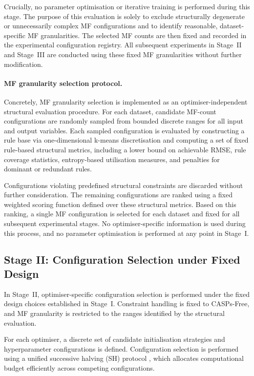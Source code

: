\documentclass[a4paper,12pt,oneside]{article}
\begin{document}
Crucially, no parameter optimisation or iterative training is performed during
this stage.
The purpose of this evaluation is solely to exclude structurally degenerate or
unnecessarily complex MF configurations and to identify reasonable,
dataset-specific MF granularities.
The selected MF counts are then fixed and recorded in the experimental
configuration registry.
All subsequent experiments in Stage~II and Stage~III are conducted using these
fixed MF granularities without further modification.
\paragraph*{MF granularity selection protocol.}
Concretely, MF granularity selection is implemented as an optimiser-independent
structural evaluation procedure.
For each dataset, candidate MF-count configurations are randomly sampled from
bounded discrete ranges for all input and output variables.
Each sampled configuration is evaluated by constructing a rule base via
one-dimensional k-means discretisation and computing a set of fixed
rule-based structural metrics, including a lower bound on achievable RMSE,
rule coverage statistics, entropy-based utilisation measures, and penalties
for dominant or redundant rules.

Configurations violating predefined structural constraints are discarded
without further consideration.
The remaining configurations are ranked using a fixed weighted scoring
function defined over these structural metrics.
Based on this ranking, a single MF configuration is selected for each dataset
and fixed for all subsequent experimental stages.
No optimiser-specific information is used during this process, and no parameter
optimisation is performed at any point in Stage~I.


\subsection{Stage II: Configuration Selection under Fixed Design}

In Stage~II, optimiser-specific configuration selection is performed under the
fixed design choices established in Stage~I.
Constraint handling is fixed to CASPs-Free, and MF granularity is restricted to
the ranges identified by the structural evaluation.

For each optimiser, a discrete set of candidate initialisation strategies and
hyperparameter configurations is defined.
Configuration selection is performed using a unified successive halving (SH)
protocol \cite{jamieson2016sh}, which allocates computational budget efficiently
across competing configurations.
\end{document}

